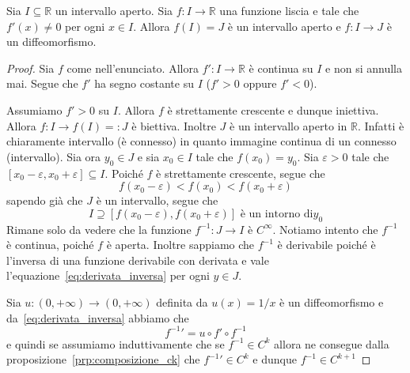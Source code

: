 \begin{lemma}
    Sia \(I \subseteq \mathbb{R}\) un intervallo aperto. Sia \(f : I \to
    \mathbb{R}\) una funzione liscia e tale che \(f'{(x)} \neq 0\) per ogni \(x
    \in I\). Allora \(f{(I)} = J\) è un intervallo aperto e \(f : I \to J\) è un
    diffeomorfismo.
\end{lemma}
\begin{proof}
    Sia \(f\) come nell'enunciato. Allora \(f' : I \to \mathbb{R}\) è continua
    su \(I\) e non si annulla mai. Segue che \(f'\) ha segno costante su \(I\)
    (\(f' > 0\) oppure \(f' < 0\)).

    Assumiamo \(f' > 0\) su \(I\). Allora \(f\) è strettamente crescente e
    dunque iniettiva. Allora \(f : I \to f{(I)} =: J\) è biettiva. Inoltre \(J\)
    è un intervallo aperto in \(\mathbb{R}\). Infatti è chiaramente intervallo
    (è connesso) in quanto immagine continua di un connesso (intervallo).  Sia
    ora \(y_{0} \in J\) e sia \(x_{0} \in I\) tale che \(f{(x_{0})} = y_{0}\).
    Sia \(\varepsilon > 0\) tale che \([x_{0} - \varepsilon, x_{0} +
    \varepsilon] \subseteq I \). Poiché \(f\) è strettamente crescente, segue
    che 
    \[
        f{(x_{0}-\varepsilon)} < f{(x_{0})} < f{(x_{0}+\varepsilon)}
    \]
    sapendo già che \(J\) è un intervallo, segue che \[I\supseteq
    [f{(x_{0}-\varepsilon)}, f{(x_{0} + \varepsilon)}] \text{ è un intorno di
\(y_{0}\)}\]
    Rimane solo da vedere che la funzione \(f^{-1} : J \to I\) è
    \(C^{\infty}\). Notiamo intento che \(f^{-1}\) è continua, poiché \(f\) è aperta.
    Inoltre sappiamo che \(f^{-1}\) è derivabile poiché è l'inversa di una
    funzione derivabile con derivata e vale
    l'equazione~\eqref{eq:derivata_inversa} per ogni \(y \in J\).

    Sia \(u : {(0, +\infty)} \to {(0, +\infty)}\) definita da \(u{(x)} = 1/x\) è
    un diffeomorfismo e da~\ref{eq:derivata_inversa} abbiamo che
    \[
        {f^{-1}}' = u \circ f' \circ f^{-1}
    \]
    e quindi se assumiamo induttivamente che se \(f^{-1} \in C^{k}\) allora ne
    consegue dalla proposizione~\ref{prp:composizione_ck} che \({f^{-1}}' \in
    C^{k}\) e dunque \(f^{-1} \in C^{k+1}\) 

\end{proof}

